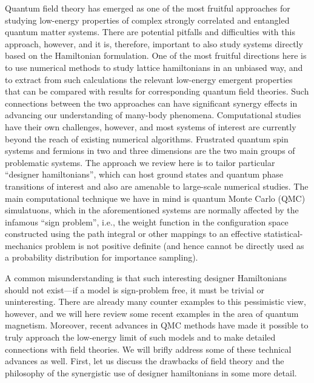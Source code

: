 \documentclass[aps,prb,groupedaddress,twocolumn]{revtex4}
\begin{document}
Quantum field theory has emerged as one of the most fruitful approaches for studying low-energy properties of
complex strongly correlated and entangled quantum matter systems. There are potential pitfalls and difficulties 
with this approach, however, and it is, therefore, important to also study systems directly based on the Hamiltonian 
formulation. One of the most fruitful directions here is to use numerical methods to study lattice hamiltonians 
in an unbiased way, and to extract from such calculations the relevant low-energy emergent properties that can 
be compared with results for corresponding quantum field theories. Such connections between the two approaches 
can have significant synergy effects in advancing our understanding of many-body phenomena. Computational studies 
have their own challenges, however, and most systems of interest are currently 
beyond the reach of existing numerical algorithms. Frustrated quantum spin systems and fermions in two and three 
dimensions are the two main groups of problematic systems. The approach we review here is to tailor particular 
``designer hamiltonians'', which can host ground states and quantum phase transitions of interest and also are 
amenable to large-scale numerical studies. The main computational technique we have in mind is quantum Monte Carlo 
(QMC) simulatuons, which in the aforementioned systems are normally affected by the infamous ``sign problem'', 
i.e., the weight function in the configuration space constructed using the path integral or other mappings to 
an effective statistical-mechanics problem is not positive definite (and hence cannot be directly used as 
a probability distribution for importance sampling).

A common misunderstanding is that such interesting designer Hamiltonians should not exist---if a model is sign-problem 
free, it must be trivial or uninteresting. There are already many counter examples to this pessimistic view, however, 
and we will here review some recent examples in the area of quantum magnetism. Moreover, recent advances in QMC methods 
have made it possible to truly approach the low-energy limit of such models and to make detailed connections with field 
theories. We will brifly address some of these technical advances as well. First, let us discuss the drawbacks of field 
theory and the philosophy of the synergistic use of designer hamiltonians in some more detail.
\end{document}
